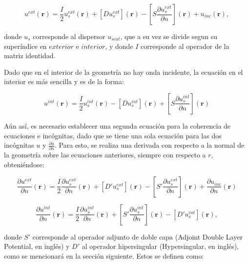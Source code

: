 \documentclass[12pt,letterpaper]{article}
\numberwithin{equation}{section}
\begin{document}
\begin{equation}
	u^{ext}(\textbf{r})=\frac{I}{2}u_s^{ext}(\textbf{r}) + \left[D u_s^{ext}\right](\textbf{r}) - \left[S \frac{\partial u_s^{ext}}{\partial n}\right](\textbf{r}) + u_{inc}(\textbf{r}),
\label{eq: sol us + uinc (ext)}
\end{equation}

\noindent donde $u_{s}$ corresponde al dispersor $u_{scat}$, que a su vez se divide segun su superíndice en $exterior$ e $interior$, y donde $I$ corresponde al operador de la matriz identidad.

Dado que en el interior de la geometría no hay onda incidente, la ecuación en el interior es más sencilla y es de la forma:

\begin{equation}
	u^{int}(\textbf{r})= \frac{I}{2}u_s^{int}(\textbf{r}) - \left[D u_s^{int}\right](\textbf{r}) + \left[S \frac{\partial u_s^{int}}{\partial n}\right](\textbf{r})
	\label{eq: sol us + uinc (int)}
\end{equation}

Aún así, es necesario establecer una segunda ecuación para la coherencia de ecuaciones e incógnitas, dado que se tiene una sola ecuación para las dos incógnitas $u$ y $\frac{\partial u}{\partial n}$. Para esto, se realiza una derivada con respecto a la normal de la geometría sobre las ecuaciones anteriores, siempre con respecto a $r$, obteniéndose:

\begin{equation}
\frac{\partial u^{ext}}{\partial n}(\textbf{r})=\frac{I}{2}\frac{\partial u_s^{ext}}{\partial n}(\textbf{r}) + \left[D' u_s^{ext}\right](\textbf{r}) - \left[S' \frac{\partial u_s^{ext}}{\partial n}\right](\textbf{r}) + \frac{\partial u_{inc}}{\partial n}(\textbf{r})
\label{eq: sol deriv us + uinc (ext)}
\end{equation}

\begin{equation}
\frac{\partial u^{int}}{\partial n}(\textbf{r})=\frac{I}{2}\frac{\partial u_s^{int}}{\partial n}(\textbf{r}) + \left[S' \frac{\partial u_s^{int}}{\partial n}\right](\textbf{r}) - \left[D' u_s^{int}\right](\textbf{r}),
\label{eq: sol deriv us + uinc (int)}
\end{equation}

\noindent donde $S'$ corresponde al operador adjunto de doble capa (Adjoint Double Layer Potential, en inglés) y $D'$ al operador hipersingular (Hypersingular, en inglés), como se mencionará en la sección siguiente. Estos se definen como:
\end{document}

